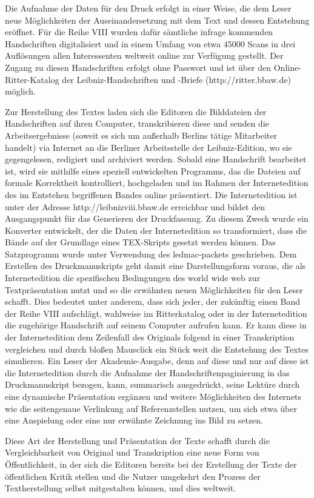 Die Aufnahme der Daten f\"{u}r den Druck erfolgt in einer Weise, die dem Leser neue M\"{o}glichkeiten der Auseinandersetzung mit dem Text und dessen Entstehung er\"{o}ffnet. F\"{u}r die Reihe VIII wurden daf\"{u}r s\"{a}mtliche infrage kommenden Handschriften digitalisiert und in einem Umfang von etwa 45000 Scans in drei Aufl\"{o}sungen allen Interessenten weltweit online zur Verf\"{u}gung gestellt. Der Zugang zu diesen Handschriften erfolgt ohne Passwort und ist \"{u}ber den Online-Ritter-Katalog der Leibniz-Handschriften und -Briefe (http://ritter.bbaw.de) m\"{o}glich.\par
Zur Herstellung des Textes laden sich die Editoren die Bilddateien der Handschriften auf ihren Computer, transkribieren diese und senden die Arbeitsergebnisse (soweit es sich um außerhalb Berlins t\"{a}tige Mitarbeiter handelt) via Internet an die Berliner Arbeitsstelle der Leibniz-Edition, wo sie gegengelesen, redigiert und archiviert werden. Sobald eine Handschrift bearbeitet ist, wird sie mithilfe eines speziell entwickelten Programms, das die Dateien auf formale Korrektheit kontrolliert, hochgeladen und im Rahmen der Internetedition des im Entstehen begriffenen Bandes online pr\"{a}sentiert. Die Internetedition ist unter der Adresse http://leibnizviii.bbaw.de erreichbar und bildet den Ausgangspunkt f\"{u}r das Generieren der Druckfassung. Zu diesem Zweck wurde ein Konverter entwickelt, der die Daten der Internetedition so transformiert, dass die B\"{a}nde auf der Grundlage eines TEX-Skripts gesetzt werden k\"{o}nnen. Das Satzprogramm wurde unter Ver\-wendung des ledmac-packets geschrieben. Dem Erstellen des Druckmanuskripts geht damit eine Darstellungsform voraus, die als Internetedition die spezifischen Bedingungen des world wide web zur Textpr\"{a}sentation nutzt und so die erw\"{a}hnten neuen M\"{o}glichkeiten f\"{u}r den Leser schafft. Dies bedeutet unter anderem, dass sich jeder, der zuk\"{u}nftig einen Band der Reihe VIII aufschl\"{a}gt, wahlweise im Ritterkatalog oder in der Internetedition die zugeh\"{o}rige Handschrift auf seinem Computer aufrufen kann. Er kann diese in der Internetedition dem Zeilenfall des Originals folgend in einer Transkription vergleichen und durch bloßen Mausclick ein St\"{u}ck weit die Entstehung des Textes simulieren. Ein Leser der Akademie-Ausgabe, denn auf diese und nur auf diese ist die Internetedition \mbox{durch} die Auf\-nahme der Handschriftenpaginierung in das Druckmanuskript bezogen, kann, summarisch ausgedr\"{u}ckt, seine Lekt\"{u}re durch eine dynamische Pr\"{a}sentation erg\"{a}nzen und weitere M\"{o}glichkeiten des Internets wie die seitengenaue Verlinkung auf Referenzstellen nutzen, um sich etwa \"{u}ber eine Anspielung oder eine nur erw\"{a}hnte Zeichnung ins Bild zu setzen.\par
Diese Art der Herstellung und Pr\"{a}sentation der Texte schafft durch die Vergleichbarkeit von Original und Transkription eine neue Form von \"{O}ffentlichkeit, in der sich die Editoren bereits bei der Erstellung der Texte der \"{o}ffentlichen Kritik stellen und die Nutzer umgekehrt den Prozess der Textherstellung selbst mitgestalten k\"{o}nnen, und dies weltweit.\par\vspace{2.0ex}

